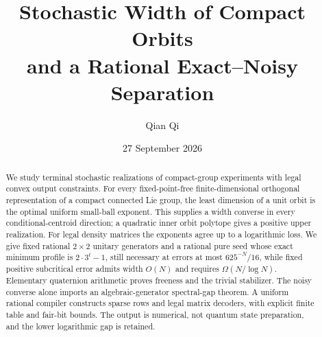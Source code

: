 \documentclass[11pt]{amsart}
\title[Stochastic width of compact orbits]{Stochastic Width of Compact Orbits\\and a Rational Exact--Noisy Separation}
\author{Qian Qi}
\date{27 September 2026}
\numberwithin{equation}{section}
\theoremstyle{definition}\newtheorem{definition}[theorem]{Definition}
\theoremstyle{remark}\newtheorem{remark}[theorem]{Remark}
\begin{document}
\begin{abstract}
We study terminal stochastic realizations of compact-group experiments
with legal convex output constraints. For every fixed-point-free
finite-dimensional orthogonal representation of a compact connected Lie
group, the least dimension of a unit orbit is the optimal uniform
small-ball exponent. This supplies a width converse in every
conditional-centroid direction; a quadratic inner orbit polytope gives
a positive upper realization. For legal density matrices the exponents
agree up to a logarithmic loss. We give fixed rational $2\times2$ unitary
generators and a rational pure seed whose exact minimum profile is
$2\cdot3^t-1$, still necessary at errors at most $625^{-N}/16$, while
fixed positive subcritical error admits width $O(N)$ and requires
$\Omega(N/\log N)$. Elementary quaternion arithmetic proves freeness
and the trivial stabilizer. The noisy converse alone imports an
algebraic-generator spectral-gap theorem. A uniform rational compiler
constructs sparse rows and legal matrix decoders, with explicit finite
table and fair-bit bounds. The output is numerical, not quantum state
preparation, and the lower logarithmic gap is retained.
\end{abstract}
\maketitle












\end{document}
